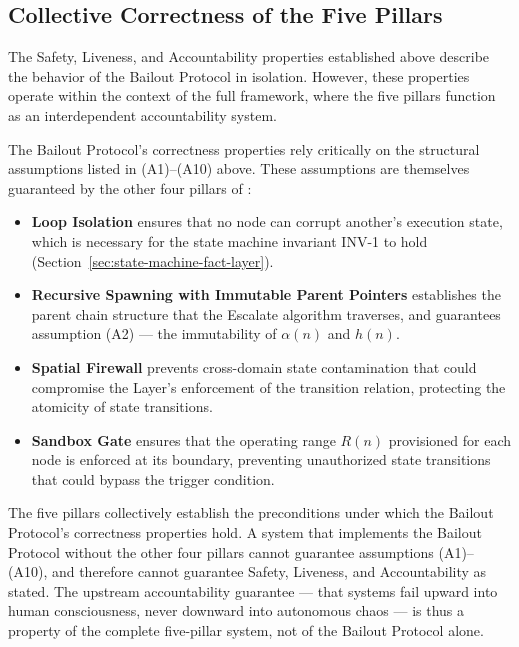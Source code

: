\bigskip
\subsection{Collective Correctness of the Five Pillars}
\label{sec:collective-correctness}

The Safety, Liveness, and Accountability properties established above describe the behavior of the Bailout Protocol in isolation. However, these properties operate within the context of the full \bxthree{} framework, where the five pillars function as an interdependent accountability system.

The Bailout Protocol's correctness properties rely critically on the structural assumptions listed in (A1)–(A10) above. These assumptions are themselves guaranteed by the other four pillars of \bxthree{}:

\begin{itemize}\itemsep=0pt
\item \textbf{Loop Isolation} ensures that no node can corrupt another's execution state, which is necessary for the state machine invariant INV-1 to hold (Section~\ref{sec:state-machine-fact-layer}).

\item \textbf{Recursive Spawning with Immutable Parent Pointers} establishes the parent chain structure that the Escalate algorithm traverses, and guarantees assumption (A2) — the immutability of $\alpha(n)$ and $h(n)$.

\item \textbf{Spatial Firewall} prevents cross-domain state contamination that could compromise the \fact{} Layer's enforcement of the transition relation, protecting the atomicity of state transitions.

\item \textbf{Sandbox Gate} ensures that the operating range $R(n)$ provisioned for each node is enforced at its boundary, preventing unauthorized state transitions that could bypass the trigger condition.
\end{itemize}

The five pillars collectively establish the preconditions under which the Bailout Protocol's correctness properties hold. A system that implements the Bailout Protocol without the other four pillars cannot guarantee assumptions (A1)–(A10), and therefore cannot guarantee Safety, Liveness, and Accountability as stated. The upstream accountability guarantee — that \bxthree{} systems fail upward into human consciousness, never downward into autonomous chaos — is thus a property of the complete five-pillar system, not of the Bailout Protocol alone.
